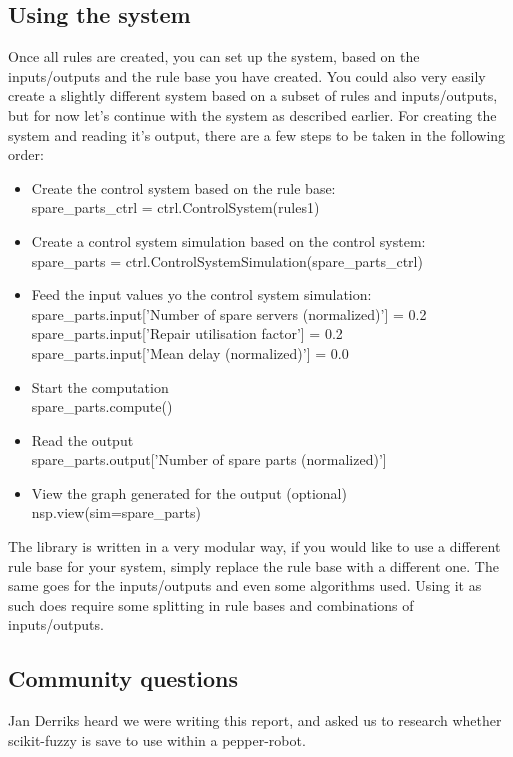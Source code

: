 \documentclass[fleqn,10pt]{SelfArx} %
\begin{document}
\subsection{Using the system}
Once all rules are created, you can set up the system, based on the inputs/outputs and the rule base you have created. You could also very easily create a slightly different system based on a subset of rules and inputs/outputs, but for now let's continue with the system as described earlier.
For creating the system and reading it's output, there are a few steps to be taken in the following order:

\begin{itemize}
    \item Create the control system based on the rule base:\\
    spare\_parts\_ctrl = ctrl.ControlSystem(rules1)
    \item Create a control system simulation based on the control system:\\
    spare\_parts = ctrl.ControlSystemSimulation(spare\_parts\_ctrl)
    \item Feed the input values yo the control system simulation:\\
    spare\_parts.input['Number of spare servers (normalized)'] = 0.2\\
    spare\_parts.input['Repair utilisation factor'] = 0.2\\
    spare\_parts.input['Mean delay (normalized)'] = 0.0
    \item Start the computation\\
    spare\_parts.compute()
    \item Read the output\\
    spare\_parts.output['Number of spare parts (normalized)']
    \item View the graph generated for the output (optional)\\
    nsp.view(sim=spare\_parts)
\end{itemize}
The library is written in a very modular way, if you would like to use a different rule base for your system, simply replace the rule base with a different one. The same goes for the inputs/outputs and even some algorithms used. Using it as such does require some splitting in rule bases and combinations of inputs/outputs.

\subsection{Community questions}
Jan Derriks heard we were writing this report, and asked us to research whether scikit-fuzzy is save to use within a pepper-robot. 
\end{document}
